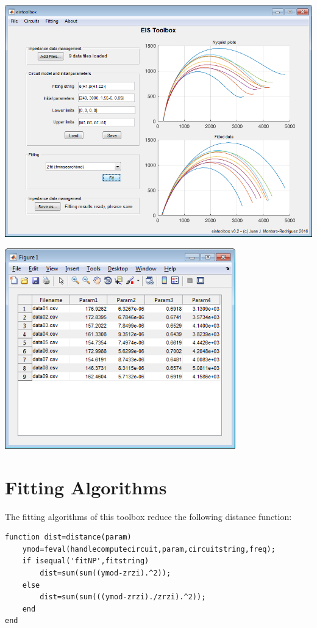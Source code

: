 \documentclass[10pt,a4paper,oneside]{book}
\begin{document}
\includegraphics[width=15cm]{main_screenshot.png}

\includegraphics[width=10cm]{scr_results.png}


\chapter{Fitting Algorithms}

The fitting algorithms of this toolbox reduce the following distance function:


\begin{verbatim}
function dist=distance(param)
    ymod=feval(handlecomputecircuit,param,circuitstring,freq);
    if isequal('fitNP',fitstring)
        dist=sum(sum((ymod-zrzi).^2));
    else
        dist=sum(sum(((ymod-zrzi)./zrzi).^2));  
    end
end
\end{verbatim}
\end{document}
